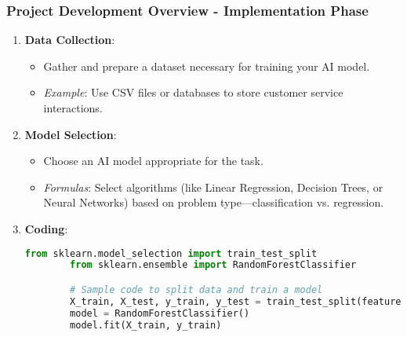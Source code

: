 \documentclass[aspectratio=169]{beamer}
\begin{document}
\begin{frame}[fragile]
    \frametitle{Project Development Overview - Implementation Phase}
    \begin{enumerate}
        \item \textbf{Data Collection}:
        \begin{itemize}
            \item Gather and prepare a dataset necessary for training your AI model.
            \item \textit{Example}: Use CSV files or databases to store customer service interactions.
        \end{itemize}
        
        \item \textbf{Model Selection}:
        \begin{itemize}
            \item Choose an AI model appropriate for the task.
            \item \textit{Formulas}: Select algorithms (like Linear Regression, Decision Trees, or Neural Networks) based on problem type—classification vs. regression.
        \end{itemize}
        
        \item \textbf{Coding}:
        \begin{lstlisting}[language=Python]
        from sklearn.model_selection import train_test_split
        from sklearn.ensemble import RandomForestClassifier

        # Sample code to split data and train a model
        X_train, X_test, y_train, y_test = train_test_split(features, labels, test_size=0.2)
        model = RandomForestClassifier()
        model.fit(X_train, y_train)
        \end{lstlisting}
    \end{enumerate}
\end{frame}
\end{document}
